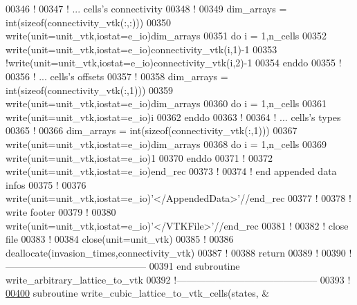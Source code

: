 \begin{DoxyCode}
00346 \textcolor{comment}{!}
00347 \textcolor{comment}{! ... cells's connectivity}
00348 \textcolor{comment}{!}
00349 dim\_arrays = int(sizeof(connectivity\_vtk(:,:)))
00350 \textcolor{keyword}{write}(unit=unit\_vtk,iostat=e\_io)dim\_arrays
00351 \textcolor{keyword}{do} i = 1,n\_cells
00352    \textcolor{keyword}{write}(unit=unit\_vtk,iostat=e\_io)connectivity\_vtk(i,1)-1
00353    \textcolor{comment}{!write(unit=unit\_vtk,iostat=e\_io)connectivity\_vtk(i,2)-1}
00354 \textcolor{keyword}{enddo}
00355 \textcolor{comment}{!}
00356 \textcolor{comment}{! ... cells's offsets}
00357 \textcolor{comment}{!}
00358 dim\_arrays = int(sizeof(connectivity\_vtk(:,1)))
00359 \textcolor{keyword}{write}(unit=unit\_vtk,iostat=e\_io)dim\_arrays
00360 \textcolor{keyword}{do} i = 1,n\_cells
00361    \textcolor{keyword}{write}(unit=unit\_vtk,iostat=e\_io)i
00362 \textcolor{keyword}{enddo}
00363 \textcolor{comment}{!}
00364 \textcolor{comment}{! ... cells's types}
00365 \textcolor{comment}{!}
00366 dim\_arrays = int(sizeof(connectivity\_vtk(:,1)))
00367 \textcolor{keyword}{write}(unit=unit\_vtk,iostat=e\_io)dim\_arrays
00368 \textcolor{keyword}{do} i = 1,n\_cells
00369    \textcolor{keyword}{write}(unit=unit\_vtk,iostat=e\_io)1
00370 \textcolor{keyword}{enddo}
00371 \textcolor{comment}{!}
00372 \textcolor{keyword}{write}(unit=unit\_vtk,iostat=e\_io)end\_rec
00373 \textcolor{comment}{!}
00374 \textcolor{comment}{! end appended data infos}
00375 \textcolor{comment}{!}
00376 \textcolor{keyword}{write}(unit=unit\_vtk,iostat=e\_io)\textcolor{stringliteral}{'</AppendedData>'}//end\_rec
00377 \textcolor{comment}{!}
00378 \textcolor{comment}{! write footer}
00379 \textcolor{comment}{!}
00380 \textcolor{keyword}{write}(unit=unit\_vtk,iostat=e\_io)\textcolor{stringliteral}{'</VTKFile>'}//end\_rec
00381 \textcolor{comment}{!}
00382 \textcolor{comment}{! close file}
00383 \textcolor{comment}{!}
00384 \textcolor{keyword}{close}(unit=unit\_vtk)
00385 \textcolor{comment}{!}
00386 \textcolor{keyword}{deallocate}(invasion\_times,connectivity\_vtk)
00387 \textcolor{comment}{!}
00388 return
00389 \textcolor{comment}{!}
00390 \textcolor{comment}{!--------------------------------------------}
00391 \textcolor{keyword}{end subroutine write\_arbitrary\_lattice\_to\_vtk}
00392 \textcolor{comment}{!--------------------------------------------}
00393 \textcolor{comment}{!}
\hypertarget{module__write__output__files_8f90_source_l00400}{}\hyperlink{classmodule__write__output__files_aaae23a8830c6c214bab18a1f35d4fc04}{00400} \textcolor{keyword}{subroutine }write\_cubic\_lattice\_to\_vtk\_cells(states,          &

\end{DoxyCode}
